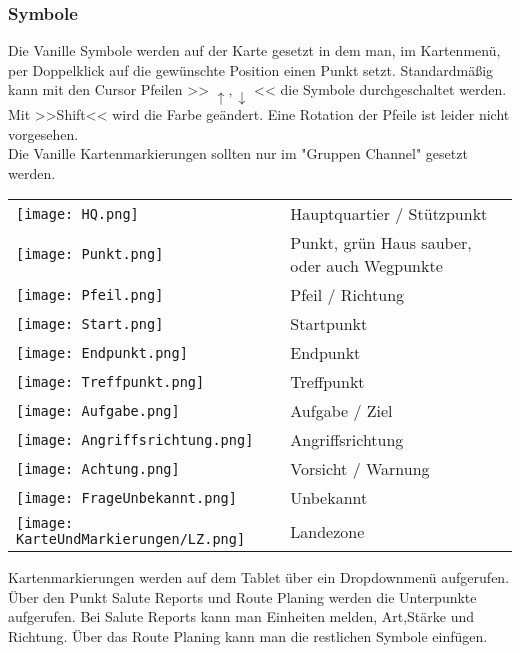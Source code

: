 \newpage

\subsubsection{Symbole}
	Die Vanille Symbole werden auf der Karte gesetzt in dem man, im Kartenmenü, per Doppelklick auf die gewünschte Position einen Punkt setzt. Standardmäßig kann mit den Cursor Pfeilen >> \begin{math} \uparrow,\downarrow \end{math} << die Symbole durchgeschaltet werden. Mit >>Shift<< wird die Farbe geändert. Eine Rotation der Pfeile ist leider nicht vorgesehen. \\
	Die Vanille Kartenmarkierungen sollten nur im "Gruppen Channel" gesetzt werden.

\begin{longtable}{p{3cm} p{15cm}}
	\texttt{[image: HQ.png]}			& 		Hauptquartier / Stützpunkt \\
	\texttt{[image: Punkt.png]}			&		Punkt, grün Haus sauber, oder auch Wegpunkte \\
	\texttt{[image: Pfeil.png]}			&		Pfeil / Richtung \\
	\texttt{[image: Start.png]}			&		Startpunkt \\
	\texttt{[image: Endpunkt.png]}		&		Endpunkt \\
	\texttt{[image: Treffpunkt.png]} 		&		Treffpunkt \\
	\texttt{[image: Aufgabe.png]}		&		Aufgabe / Ziel \\
	\texttt{[image: Angriffsrichtung.png]}	& 		Angriffsrichtung \\
	\texttt{[image: Achtung.png]}		&		Vorsicht / Warnung \\
	\texttt{[image: FrageUnbekannt.png]}	& 		Unbekannt \\
	\texttt{[image: KarteUndMarkierungen/LZ.png]}			&		Landezone
\end{longtable}

\newpage

	Kartenmarkierungen werden auf dem Tablet über ein Dropdownmenü aufgerufen. Über den Punkt Salute Reports und Route Planing werden die Unterpunkte aufgerufen. Bei Salute Reports kann man Einheiten melden, Art,Stärke und Richtung. Über das Route Planing kann man die restlichen Symbole einfügen.

